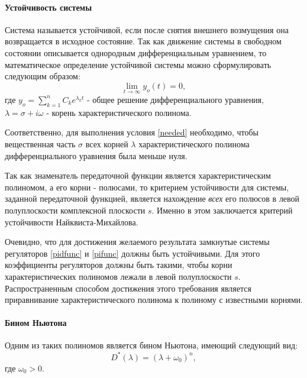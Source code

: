 \paragraph*{Устойчивость системы\\}
\hspace*{\parindent}Система называется устойчивой, если после снятия внешнего возмущения она возвращается в исходное состояние. Так как движение системы в свободном состоянии описывается однородным дифференциальным уравнением, то математическое определение устойчивой системы можно сформулировать следующим образом: 
\begin{equation}\label{needed}
	\lim_{t \to \infty} y_{o}(t) = 0,
\end{equation}
где $y_{o} = \sum_{k=1}^{n} C_ke^{\lambda_kt}$ - общее решение дифференциального уравнения, $\lambda = \sigma+i\omega$ - корень характеристического полинома.

Соответственно, для выполнения условия \eqref{needed} необходимо, чтобы вещественная часть $\sigma$ всех корней $\lambda$ характеристического полинома дифференциального уравнения была меньше нуля. 

Так как знаменатель передаточной функции является характеристическим полиномом, а его корни - полюсами, то критерием устойчивости для системы, заданной передаточной функцией, является нахождение \textit{всех} его полюсов в левой полуплоскости  комплексной плоскости $s$. Именно в этом заключается критерий устойчивости Найквиста-Михайлова.

Очевидно, что для достижения желаемого результата замкнутые системы регуляторов \eqref{pidfunc} и \eqref{pifunc} должны быть устойчивыми. Для этого коэффициенты регуляторов должны быть такими, чтобы корни характеристических полиномов лежали в левой полуплоскости $s$. Распространенным способом достижения этого требования является приравнивание характеристического полинома к полиному с известными корнями.

\paragraph*{Бином Ньютона\\}
\hspace*{\parindent}Одним из таких полиномов является бином Ньютона, имеющий следующий вид: 
\begin{equation}\label{newt}
	D^*(\lambda)=(\lambda+\omega_0)^n,
\end{equation}
где $\omega_0 > 0$.

